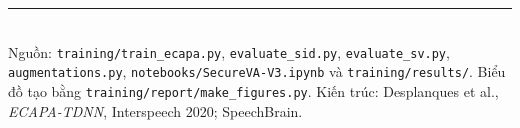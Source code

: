 \documentclass[12pt,a4paper]{article}
\begin{document}
\vfill
\noindent\rule{\linewidth}{0.4pt}\\
\small Nguồn: \texttt{training/train\_ecapa.py}, \texttt{evaluate\_sid.py},
\texttt{evaluate\_sv.py}, \texttt{augmentations.py}, \texttt{notebooks/SecureVA-V3.ipynb}
và \texttt{training/results/}. Biểu đồ tạo bằng \texttt{training/report/make\_figures.py}.
Kiến trúc: Desplanques et al., \emph{ECAPA-TDNN}, Interspeech 2020; SpeechBrain.
\end{document}
